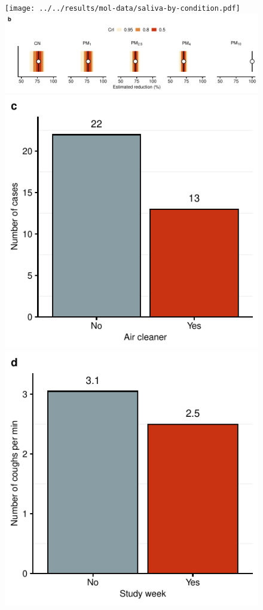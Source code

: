 \documentclass[fleqn,11pt]{wlscirep}
\begin{document}
\begin{figure}[!htpb]
\centering
    \texttt{[image: ../../results/mol-data/saliva-by-condition.pdf]}
    \includegraphics{../../results/env-data/estimation-results-figure.pdf}
    \includegraphics{../../results/epi-data/cases_by_condition.pdf}
    \includegraphics{results/cough-data/coughs-frequency-by-condition.pdf}

\end{figure}
\end{document}
